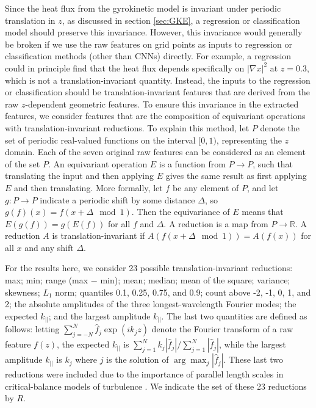 \documentclass{jpp}
\begin{document}
Since the heat flux from the gyrokinetic model is invariant under periodic translation in $z$, as discussed in section \ref{sec:GKE}, a regression or classification model should preserve this invariance.
However, this invariance would generally be broken if we use the raw features on grid points as inputs to regression or classification methods (other than CNNs) directly.
For example, a regression could in principle find that the heat flux depends specifically on $|\nabla x|^2$ at $z=0.3$, which is not a translation-invariant quantity.
Instead, the inputs to the regression or classification should be translation-invariant features that are derived from the raw $z$-dependent geometric features.
To ensure this invariance in the extracted features, we consider features that are the composition of equivariant operations with translation-invariant reductions.
To explain this method, let $P$ denote the set of periodic real-valued functions on the interval $[0, 1)$, representing the $z$ domain.
Each of the seven original raw features can be considered as an element of the set $P$.
An equivariant operation $E$ is a function from $P\to P$, such that translating the input and then applying $E$ gives the same result as first applying $E$ and then translating.
More formally, let $f$ be any element of $P$, and let $g:P\to P$ indicate a periodic shift by some distance $\Delta$, so $g(f)(x)=f(x + \Delta \mod 1)$.
Then the equivariance of $E$ means that $E(g(f)) = g(E(f))$ for all $f$ and $\Delta$.
A reduction is a map from $P \to \mathbb{R}$. A reduction $A$ is translation-invariant if $A(f(x + \Delta \mod 1)) = A(f(x))$ for all $x$ and any shift $\Delta$.

For the results here, we consider 23 possible translation-invariant reductions: max; min; range (max $-$ min); mean; median; mean of the square; variance; skewness; $L_1$ norm; quantiles 0.1, 0.25, 0.75, and 0.9; count above -2, -1, 0, 1, and 2; the absolute amplitudes of the three longest-wavelength Fourier modes; the expected $k_{||}$; and the largest amplitude $k_{||}$.
The last two quantities are defined as follows: letting $\sum_{j=-N}^N \hat{f}_j \exp(i k_j z)$ denote the Fourier transform of a raw feature $f(z)$, the expected $k_{||}$ is $\sum_{j=1}^N k_j |\hat{f}_j| / \sum_{j=1}^N |\hat{f}_j|$, while the largest amplitude $k_{||}$ is $k_j$ where $j$ is the solution of $\arg\max_j |\hat{f}_j|$.
These last two reductions were included due to the importance of parallel length scales in critical-balance models of turbulence \citep{barnes2011critically}.
We indicate the set of these 23 reductions by $R$.
\end{document}
